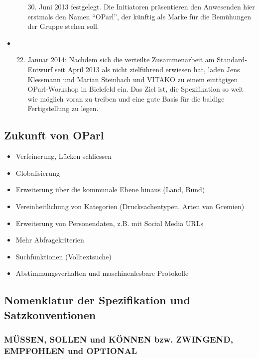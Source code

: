 \documentclass[,a4paper]{article}
\begin{document}
\begin{itemize}
\begin{enumerate}[1.]
    30. Juni 2013 festgelegt. Die Initiatoren präsentieren den
    Anwesenden hier erstmals den Namen ``OParl'', der künftig als Marke
    für die Bemühungen der Gruppe stehen soll.
  \end{enumerate}
\item
  \begin{enumerate}[1.]
  \setcounter{enumi}{21}
  \item
    Januar 2014: Nachdem sich die verteilte Zusammenarbeit am
    Standard-Entwurf seit April 2013 als nicht zielführend erwiesen hat,
    laden Jens Klessmann und Marian Steinbach und VITAKO zu einem
    eintägigen OParl-Workshop in Bielefeld ein. Das Ziel ist, die
    Spezifikation so weit wie möglich voran zu treiben und eine gute
    Basis für die baldige Fertigstellung zu legen.
  \end{enumerate}
\end{itemize}

\subsection{Zukunft von OParl}

\begin{itemize}
\item
  Verfeinerung, Lücken schliessen
\item
  Globalisierung
\item
  Erweiterung über die kommunale Ebene hinaus (Land, Bund)
\item
  Vereinheitlichung von Kategorien (Drucksachentypen, Arten von Gremien)
\item
  Erweiterung von Personendaten, z.B. mit Social Media URLs
\item
  Mehr Abfragekriterien
\item
  Suchfunktionen (Volltextsuche)
\item
  Abstimmungsverhalten und maschinenlesbare Protokolle
\end{itemize}

\subsection{Nomenklatur der Spezifikation und Satzkonventionen}

\subsubsection{MÜSSEN, SOLLEN und KÖNNEN bzw. ZWINGEND, EMPFOHLEN und
OPTIONAL}
\end{document}
